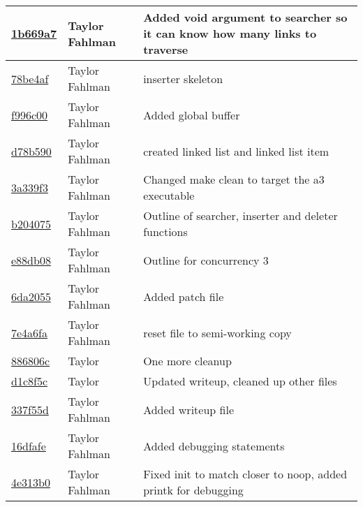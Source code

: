 \begin{tabular}{l l l}
\href{git@github.com:fahlmant/cs444/commit/1b669a7f2ee9d13ba60e92be4d83db9569866bfc}{1b669a7} & Taylor Fahlman & Added void argument to searcher so it can know how many links to traverse\\\hline
\href{git@github.com:fahlmant/cs444/commit/78be4afe0b06da4185d41362312d3d124971ac9c}{78be4af} & Taylor Fahlman & inserter skeleton\\\hline
\href{git@github.com:fahlmant/cs444/commit/f996c006d61d3b31ba4570b25c11d30054dd0bd3}{f996c00} & Taylor Fahlman & Added global buffer\\\hline
\href{git@github.com:fahlmant/cs444/commit/d78b59016da477c48d733d257f3ff1f218cad153}{d78b590} & Taylor Fahlman & created linked list and linked list item\\\hline
\href{git@github.com:fahlmant/cs444/commit/3a339f3c25f472320ff955659e62ab5bef342bd1}{3a339f3} & Taylor Fahlman & Changed make clean to target the a3 executable\\\hline
\href{git@github.com:fahlmant/cs444/commit/b204075045d96c979c5f23c948a7aa96f7593ea5}{b204075} & Taylor Fahlman & Outline of searcher, inserter and deleter functions\\\hline
\href{git@github.com:fahlmant/cs444/commit/e88db0870f79e0fda434105d2b1a43ffe33248d0}{e88db08} & Taylor Fahlman & Outline for concurrency 3\\\hline
\href{git@github.com:fahlmant/cs444/commit/6da20559bf2fd5648a71e263be1fcddb68cb1786}{6da2055} & Taylor Fahlman & Added patch file\\\hline
\href{git@github.com:fahlmant/cs444/commit/7e4a6fad9eede1051a7ebc5db14bd3f360077816}{7e4a6fa} & Taylor Fahlman & reset file to semi-working copy\\\hline
\href{git@github.com:fahlmant/cs444/commit/886806cc8700041836984270d8457cb305283982}{886806c} & Taylor & One more cleanup\\\hline
\href{git@github.com:fahlmant/cs444/commit/d1c8f5c0597b0374c8fa150baf8654161f50eb83}{d1c8f5c} & Taylor & Updated writeup, cleaned up other files\\\hline
\href{git@github.com:fahlmant/cs444/commit/337f55d1a7a77b5840ab7cd55d3b98e6f8a4ea61}{337f55d} & Taylor Fahlman & Added writeup file\\\hline
\href{git@github.com:fahlmant/cs444/commit/16dfafe2b2ddaa55c00dc6f13d1624f5f348abdc}{16dfafe} & Taylor Fahlman & Added debugging statements\\\hline
\href{git@github.com:fahlmant/cs444/commit/4e313b07a7ce52c2eeb15e77780b0344fd58e776}{4e313b0} & Taylor Fahlman & Fixed init to match closer to noop, added printk for debugging\\\hline

\end{tabular}
